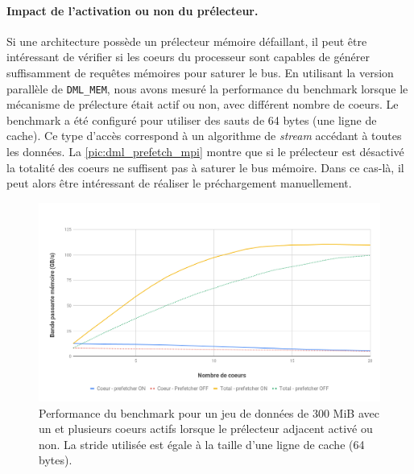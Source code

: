        \paragraph{Impact de l'activation ou non du prélecteur.} 
            Si une architecture possède un prélecteur mémoire défaillant, il peut être intéressant de vérifier si les coeurs du processeur sont capables de générer suffisamment de requêtes mémoires pour saturer le bus.
            En utilisant la version parallèle de \verb=DML_MEM=, nous avons mesuré la performance du benchmark lorsque le mécanisme de prélecture était actif ou non, avec différent nombre de coeurs. Le benchmark a été configuré pour utiliser des sauts de 64 bytes (une ligne de cache). Ce type d'accès correspond à un algorithme de \textit{stream} accédant à toutes les données.  La \autoref{pic:dml_prefetch_mpi} montre que si le prélecteur est désactivé la totalité des coeurs ne suffisent pas à saturer le bus mémoire. Dans ce cas-là, il peut alors être intéressant de réaliser le préchargement manuellement.
        
                \begin{figure}
                \center
                \includegraphics[width=14cm]{images/dml_prefetch_mpi.png}
                \caption{\label{pic:dml_prefetch_mpi} Performance du benchmark pour un jeu de données de 300 MiB avec un et plusieurs coeurs actifs lorsque le prélecteur adjacent activé ou non. La stride utilisée est égale à la taille d'une ligne de cache (64 bytes).}
                \end{figure}

        
